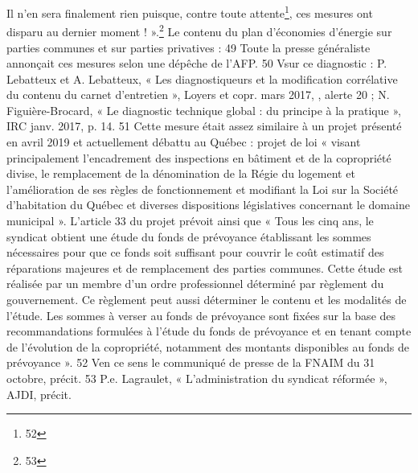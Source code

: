 		Il n’en sera finalement rien puisque, contre toute attente\footnote{52}, ces mesures ont disparu au dernier moment ! ».\footnote{53}
		Le contenu du plan d’économies d’énergie sur parties communes et sur parties privatives :
		49 Toute la presse généraliste annonçait ces mesures selon une dépêche de l’AFP.
		50 V\degres sur ce diagnostic : P. Lebatteux et A. Lebatteux, « Les diagnostiqueurs et la modification corrélative du contenu du carnet d’entretien », Loyers et copr. mars 2017, , alerte 20 ; N. Figuière-Brocard, « Le diagnostic technique global : du principe à la pratique », IRC janv. 2017, p. 14.
		51 Cette mesure était assez similaire à un projet présenté en avril 2019 et actuellement débattu au Québec : projet de loi  « visant principalement l’encadrement des inspections en bâtiment et de la copropriété divise, le remplacement de la dénomination de la Régie du logement et l’amélioration de ses règles de fonctionnement et modifiant la Loi sur la Société d’habitation du Québec et diverses dispositions législatives concernant le domaine municipal ». L’article 33 du projet prévoit ainsi que « Tous les cinq ans, le syndicat obtient une étude du fonds de prévoyance établissant les sommes nécessaires pour que ce fonds soit suffisant pour couvrir le coût estimatif des réparations majeures et de remplacement des parties communes. Cette étude est réalisée par un membre d’un ordre professionnel déterminé par règlement du gouvernement. Ce règlement peut aussi déterminer le contenu et les modalités de l’étude. Les sommes à verser au fonds de prévoyance sont fixées sur la base des recommandations formulées à l’étude du fonds de prévoyance et en tenant compte de l’évolution de la copropriété, notamment des montants disponibles au fonds de prévoyance ».
		52 V\degres en ce sens le communiqué de presse de la FNAIM du 31 octobre, précit.
		53 P.e. Lagraulet, « L’administration du syndicat réformée », AJDI, précit.
